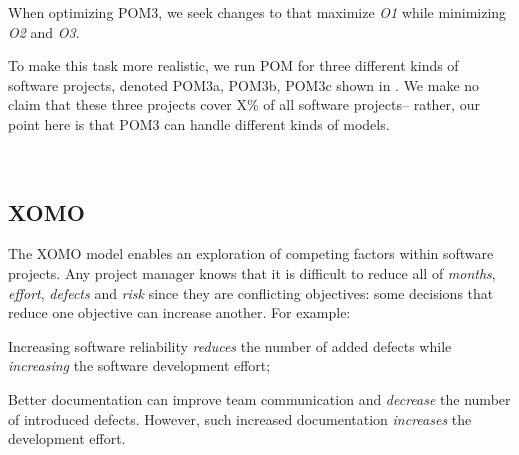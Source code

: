When optimizing POM3, we seek 
changes to  that maximize {\em O1}
while minimizing  {\em O2} and {\em O3}. 

To make this task more realistic, we run POM
for three different kinds of software projects, denoted POM3a, POM3b, POM3c
shown in . We make no claim that these three projects cover X\% of all
software projects-- rather, our point here is that POM3 can handle different kinds of models.


~\subsection{XOMO}
The XOMO model enables an exploration of competing factors 
within software projects.
Any project manager knows that it is difficult to reduce all of {\em months}, {\em
  effort}, {\em defects} and {\em risk} since they
are conflicting objectives: some decisions that
reduce one objective can increase another.  For
example:
\bi
\item
Increasing
software reliability   {\em reduces} the
  number of added defects while {\em increasing} the 
software development effort;
\item 
Better documentation can improve team communication and {\em decrease} the number of introduced defects.
However, such increased documentation {\em increases} the development effort.
\ei

